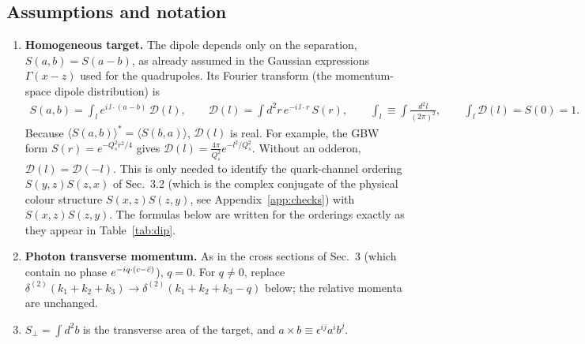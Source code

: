 \documentclass[9pt]{article}
\numberwithin{equation}{section}
\begin{document}
\subsection{Assumptions and notation}
\begin{enumerate}
    \item \textbf{Homogeneous target.} The dipole depends only on the separation, $S(a,b)=S(a-b)$, as already assumed in the Gaussian expressions $\Gamma(x-z)$ used for the quadrupoles. Its Fourier transform (the momentum-space dipole distribution) is
    \begin{align}\label{eq:Ddef}
        S(a,b) = \int_{l} e^{i\,l\cdot(a-b)}\,\mathcal{D}(l),\hspace{2em} \mathcal{D}(l) = \int d^{2}r\, e^{-i\,l\cdot r}\,S(r),\hspace{2em} \int_{l}\equiv\int\frac{d^{2}l}{(2\pi)^{2}},\hspace{2em}\int_{l}\mathcal{D}(l) = S(0) = 1 .
    \end{align}
    Because $\langle S(a,b)\rangle^{*}=\langle S(b,a)\rangle$, $\mathcal{D}(l)$ is real. For example, the GBW form $S(r)=e^{-Q^{2}_{s}r^{2}/4}$ gives $\mathcal{D}(l)=\frac{4\pi}{Q^{2}_{s}}e^{-l^{2}/Q^{2}_{s}}$. Without an odderon, $\mathcal{D}(l)=\mathcal{D}(-l)$. This is only needed to identify the quark-channel ordering $S(y,z)S(z,x)$ of Sec.~3.2 (which is the complex conjugate of the physical colour structure $S(x,z)S(z,y)$, see Appendix~\ref{app:checks}) with $S(x,z)S(z,y)$. The formulas below are written for the orderings exactly as they appear in Table~\ref{tab:dip}.
    \item \textbf{Photon transverse momentum.} As in the cross sections of Sec.~3 (which contain no phase $e^{-iq\cdot(c-\Bar{c})}$), $q=0$. For $q\neq 0$, replace $\delta^{(2)}(k_{1}+k_{2}+k_{3})\rightarrow\delta^{(2)}(k_{1}+k_{2}+k_{3}-q)$ below; the relative momenta are unchanged.
    \item $S_{\perp}=\int d^{2}b$ is the transverse area of the target, and $a\times b\equiv\epsilon^{ij}a^{i}b^{j}$.
\end{enumerate}
\end{document}
